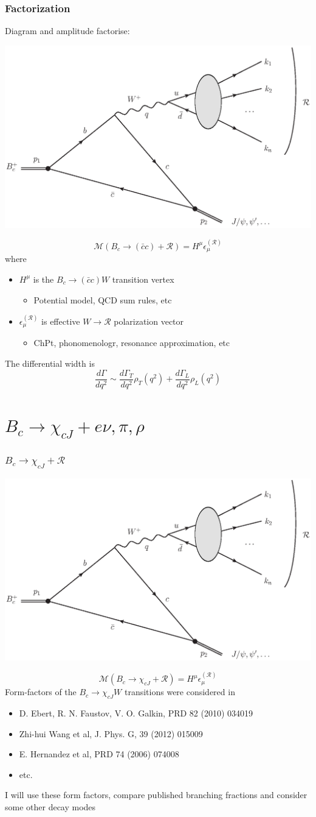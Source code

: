 \documentclass{beamer}
\newcommand{\R}{\mathcal{R}}
\newcommand{\M}{\mathcal{M}}
\newcommand{\cc}{(\bar{c}c)}
\begin{document}
\begin{frame}[t]
  \frametitle{Factorization}
  Diagram and amplitude factorise:
  \begin{center}
    \includegraphics[width=0.4\columnwidth]{diags_BcCCW}
  \end{center}
      $$\M\left(B_c \to \cc + \R\right) = H^\mu \epsilon^{(\R)}_\mu$$
   where
   \begin{itemize}
   \item $H^\mu$ is the $B_c\to \cc W$ transition vertex
     \begin{itemize}
     \item Potential model, QCD sum rules, etc
     \end{itemize}
   \item $\epsilon^{(\R)}_\mu$ is effective  $W\to\R$ polarization vector
     \begin{itemize}
     \item ChPt, phonomenologr, resonance approximation, etc
     \end{itemize}
   \end{itemize}
The differential width is
$$
\frac{d\Gamma}{dq^2} \sim \frac{d\Gamma_T}{dq^2} \rho_T\left(q^2\right) + \frac{d\Gamma_L}{dq^2} \rho_L\left(q^2\right)
$$
\end{frame}

\section{$B_c\to \chi_{cJ}+e\nu, \pi, \rho$}
\begin{frame}
  \frametitle{$B_c\to \chi_{cJ}+\R$}
\begin{center}
  \includegraphics[width=0.5\columnwidth]{diags_BcCCW}
\end{center}
$$\M\left(B_c \to \chi_{cJ} + \R\right) = H^\mu \epsilon^{(\R)}_\mu$$
Form-factors of the $B_c\to \chi_{cJ}W$ transitions were considered in
\begin{itemize}
\item D. Ebert, R. N. Faustov, V. O. Galkin, PRD 82 (2010) 034019 
\item Zhi-hui Wang et al,  	J. Phys. G,  39 (2012) 015009
\item E. Hernandez et al, PRD      74 (2006) 074008
\item etc.
\end{itemize}
I will use these form factors, compare published branching fractions and consider some other decay modes
\end{frame}
\end{document}
